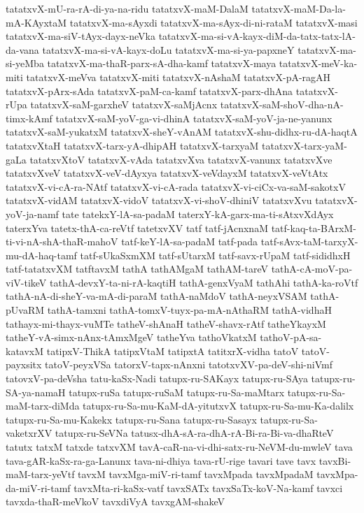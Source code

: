 {tatatxvX-mU-ra-rA-di-ya-na-ridu
tatatxvX-maM-DalaM
tatatxvX-maM-Da-la-mA-KAyxtaM
tatatxvX-ma-sAyxdi
tatatxvX-ma-sAyx-di-ni-rataM
tatatxvX-masi
tatatxvX-ma-siV-tAyx-dayx-neVka
tatatxvX-ma-si-vA-kayx-diM-da-tatx-tatx-lA-da-vana
tatatxvX-ma-si-vA-kayx-doLu
tatatxvX-ma-si-ya-papxneY
tatatxvX-ma-si-yeMba
tatatxvX-ma-thaR-parx-sA-dha-kamf
tatatxvX-maya
tatatxvX-meV-ka-miti
tatatxvX-meVva
tatatxvX-miti
tatatxvX-nAshaM
tatatxvX-pA-ragAH
tatatxvX-pArx-sAda
tatatxvX-paM-ca-kamf
tatatxvX-parx-dhAna
tatatxvX-rUpa
tatatxvX-saM-garxheV
tatatxvX-saMjAcnx
tatatxvX-saM-shoV-dha-nA-timx-kAmf
tatatxvX-saM-yoV-ga-vi-dhinA
tatatxvX-saM-yoV-ja-ne-yanunx
tatatxvX-saM-yukatxM
tatatxvX-sheY-vAnAM
tatatxvX-shu-didhx-ru-dA-haqtA
tatatxvXtaH
tatatxvX-tarx-yA-dhipAH
tatatxvX-tarxyaM
tatatxvX-tarx-yaM-gaLa
tatatxvXtoV
tatatxvX-vAda
tatatxvXva
tatatxvX-vanunx
tatatxvXve
tatatxvXveV
tatatxvX-veV-dAyxya
tatatxvX-veVdayxM
tatatxvX-veVtAtx
tatatxvX-vi-cA-ra-NAtf
tatatxvX-vi-cA-rada
tatatxvX-vi-ciCx-va-saM-sakotxV
tatatxvX-vidAM
tatatxvX-vidoV
tatatxvX-vi-shoV-dhiniV
tatatxvXvu
tatatxvX-yoV-ja-namf
tate
tatekxY-lA-sa-padaM
taterxY-kA-garx-ma-ti-sAtxvXdAyx
taterxYva
tatetx-thA-ca-reVtf
tatetxvXV
tatf
tatf-jAcnxnaM
tatf-kaq-ta-BArxM-ti-vi-nA-shA-thaR-mahoV
tatf-keY-lA-sa-padaM
tatf-pada
tatf-sAvx-taM-tarxyX-mu-dA-haq-tamf
tatf-sUkaSxmXM
tatf-sUtarxM
tatf-savx-rUpaM
tatf-sididhxH
tatf-tatatxvXM
tatftavxM
tathA
tathAMgaM
tathAM-tareV
tathA-cA-moV-pa-viV-tikeV
tathA-devxY-ta-ni-rA-kaqtiH
tathA-genxVyaM
tathAhi
tathA-ka-roVtf
tathA-nA-di-sheY-va-mA-di-paraM
tathA-naMdoV
tathA-neyxVSAM
tathA-pUvaRM
tathA-tamxni
tathA-tomxV-tuyx-pa-mA-nAthaRM
tathA-vidhaH
tathayx-mi-thayx-vuMTe
tatheV-shAnaH
tatheV-shavx-rAtf
tatheYkayxM
tatheY-vA-simx-nAnx-tAmxMgeV
tatheYva
tathoVkatxM
tathoV-pA-sa-katavxM
tatipxV-ThikA
tatipxVtaM
tatipxtA
tatitxrX-vidha
tatoV
tatoV-payxsitx
tatoV-peyxVSa
tatorxV-tapx-nAnxni
tatotxvXV-pa-deV-shi-niVmf
tatovxV-pa-deVsha
tatu-kaSx-Nadi
tatupx-ru-SAKayx
tatupx-ru-SAya
tatupx-ru-SA-ya-namaH
tatupx-ruSa
tatupx-ruSaM
tatupx-ru-Sa-maMtarx
tatupx-ru-Sa-maM-tarx-diMda
tatupx-ru-Sa-mu-KaM-dA-yitutxvX
tatupx-ru-Sa-mu-Ka-dalilx
tatupx-ru-Sa-mu-Kakekx
tatupx-ru-Sana
tatupx-ru-Sasayx
tatupx-ru-Sa-vaketxrXV
tatupx-ru-SeVNa
tatusx-dhA-sA-ra-dhA-rA-Bi-ra-Bi-va-dhaRteV
tatutx
tatxM
tatxde
tatxvXM
tavA-caR-na-vi-dhi-satx-ru-NeVM-du-mwleV
tava
tava-gAR-kaSx-ra-ga-Lanunx
tava-ni-dhiya
tava-rU-rige
tavari
tave
tavx
tavxBi-maM-tarx-yeVtf
tavxM
tavxMga-miV-ri-tamf
tavxMpada
tavxMpadaM
tavxMpa-da-miV-ri-tamf
tavxMta-ri-kaSx-vatf
tavxSATx
tavxSaTx-koV-Na-kamf
tavxci
tavxda-thaR-meVkoV
tavxdiVyA
tavxgAM-shakeV
}
